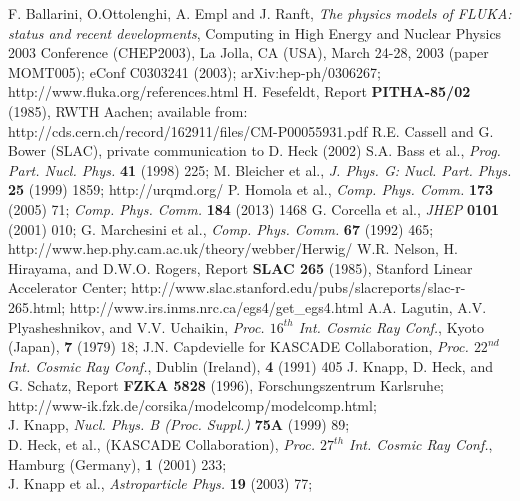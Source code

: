               F. Ballarini, O.Ottolenghi, A. Empl and J. Ranft,
              {\it The physics models of FLUKA: status and recent developments},
              Computing in High Energy and Nuclear Physics 2003
              Conference (CHEP2003), La Jolla, CA (USA), March 24-28, 2003
              (paper MOMT005); eConf C0303241 (2003); arXiv:hep-ph/0306267;
              http://www.fluka.org/references.html
 H. Fesefeldt, Report {\bf PITHA-85/02} (1985), 
              RWTH Aachen; available from: 
              http://cds.cern.ch/record/162911/files/CM-P00055931.pdf
 R.E. Cassell and G. Bower (SLAC), private communication 
              to D. Heck (2002)
 S.A. Bass et al., {\it Prog. Part. Nucl. Phys.} {\bf 41}
              (1998) 225; M. Bleicher et al., {\it J. Phys. G: Nucl.
              Part. Phys.} {\bf 25} (1999) 1859;
              http://urqmd.org/
 P. Homola et al., {\it Comp. Phys. Comm.} {\bf 173}
              (2005) 71; {\it Comp. Phys. Comm.} {\bf 184} (2013) 1468 
G. Corcella et al., {\it JHEP} {\bf 0101} (2001) 010;
              G. Marchesini et al., {\it Comp. Phys. Comm.} {\bf 67} (1992) 465;
              http://www.hep.phy.cam.ac.uk/theory/webber/Herwig/
 W.R. Nelson, H. Hirayama, and D.W.O. Rogers, Report
              {\bf SLAC 265} (1985), Stanford Linear Accelerator Center;
              http://www.slac.stanford.edu/pubs/slacreports/slac-r-265.html;
              http://www.irs.inms.nrc.ca/egs4/get\_egs4.html 
 A.A. Lagutin, A.V. Plyasheshnikov, and V.V. Uchaikin, 
              {\it Proc. $16^{th}$ Int. Cosmic Ray Conf.}, Kyoto (Japan), 
              {\bf 7} (1979) 18;
              J.N. Capdevielle for KASCADE Collaboration, {\it Proc. $22^{nd}$ 
              Int. Cosmic Ray Conf.}, Dublin (Ireland), {\bf 4} (1991) 405
 J. Knapp, D. Heck, and G. Schatz, Report 
              {\bf FZKA 5828} (1996), Forschungszentrum Karls\-ruhe;
              http://www-ik.fzk.de/corsika/modelcomp/modelcomp.html;\\
              J. Knapp, {\it Nucl. Phys. B (Proc. Suppl.)} {\bf 75A}
              (1999) 89;\\
              D. Heck, et al., (KASCADE Collaboration), {\it Proc.
              $27^{th}$ Int. Cosmic Ray Conf.}, Hamburg (Germany),
              {\bf 1} (2001) 233;\\
              J. Knapp et al., {\it Astroparticle Phys.} {\bf 19} (2003) 77;\\
